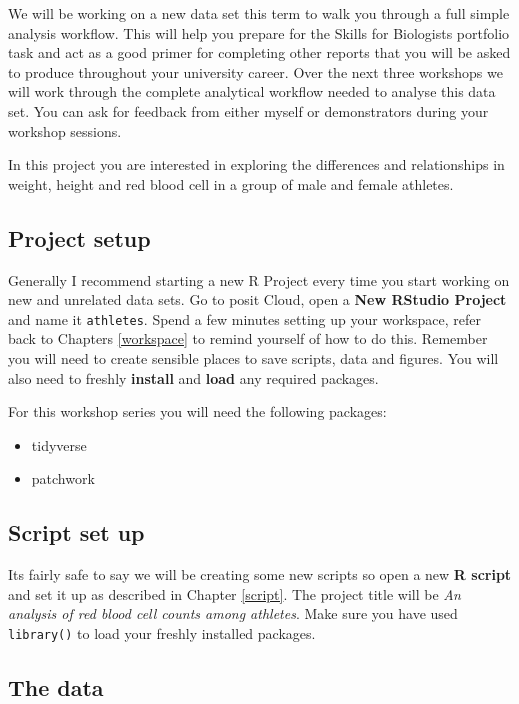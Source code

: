 \documentclass[
]{book}
\providecommand{\tightlist}{%
  \setlength{\itemsep}{0pt}\setlength{\parskip}{0pt}}
\begin{document}
We will be working on a new data set this term to walk you through a full simple analysis workflow. This will help you prepare for the Skills for Biologists portfolio task and act as a good primer for completing other reports that you will be asked to produce throughout your university career. Over the next three workshops we will work through the complete analytical workflow needed to analyse this data set. You can ask for feedback from either myself or demonstrators during your workshop sessions.

In this project you are interested in exploring the differences and relationships in weight, height and red blood cell in a group of male and female athletes.

\subsection{Project setup}\label{project-setup}

Generally I recommend starting a new R Project every time you start working on new and unrelated data sets. Go to posit Cloud, open a \textbf{New RStudio Project} and name it \texttt{athletes}. Spend a few minutes setting up your workspace, refer back to Chapters \ref{workspace} to remind yourself of how to do this. Remember you will need to create sensible places to save scripts, data and figures. You will also need to freshly \textbf{install} and \textbf{load} any required packages.

For this workshop series you will need the following packages:

\begin{itemize}
\tightlist
\item
  tidyverse
\item
  patchwork
\end{itemize}

\subsection{Script set up}\label{script-set-up}

Its fairly safe to say we will be creating some new scripts so open a new \textbf{R script} and set it up as described in Chapter \ref{script}. The project title will be \emph{An analysis of red blood cell counts among athletes}. Make sure you have used \texttt{library()} to load your freshly installed packages.

\subsection{The data}\label{the-data}
\end{document}
